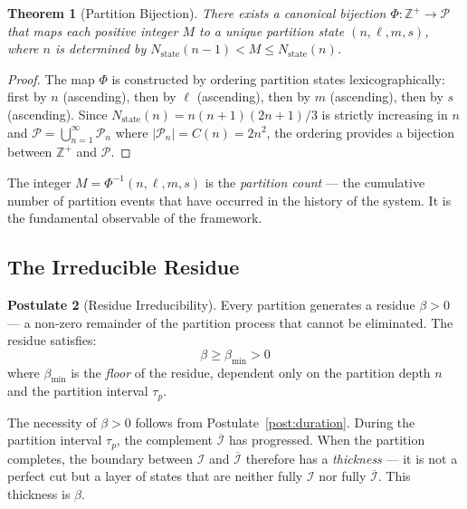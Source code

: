 \documentclass[11pt,twocolumn,a4paper]{article}
\theoremstyle{plain}
\newtheorem{theorem}{Theorem}[section]
\theoremstyle{definition}
\newtheorem{postulate}[theorem]{Postulate}
\theoremstyle{remark}
\begin{document}
\begin{theorem}[Partition Bijection]
\label{thm:bijection}
There exists a canonical bijection $\Phi: \mathbb{Z}^+ \to \mathcal{P}$ that
maps each positive integer $M$ to a unique partition state $(n,\ell,m,s)$, where
$n$ is determined by $N_{\mathrm{state}}(n-1) < M \leq N_{\mathrm{state}}(n)$.
\end{theorem}

\begin{proof}
The map $\Phi$ is constructed by ordering partition states lexicographically:
first by $n$ (ascending), then by $\ell$ (ascending), then by $m$ (ascending),
then by $s$ (ascending). Since $N_{\mathrm{state}}(n) = n(n+1)(2n+1)/3$ is
strictly increasing in $n$ and $\mathcal{P} = \bigcup_{n=1}^\infty
\mathcal{P}_n$ where $|\mathcal{P}_n| = C(n) = 2n^2$, the ordering provides a
bijection between $\mathbb{Z}^+$ and $\mathcal{P}$.
\end{proof}

The integer $M = \Phi^{-1}(n,\ell,m,s)$ is the \emph{partition count} --- the
cumulative number of partition events that have occurred in the history of the
system. It is the fundamental observable of the framework.

\subsection{The Irreducible Residue}
\label{subsec:residue}

\begin{postulate}[Residue Irreducibility]
\label{post:floor}
Every partition generates a residue $\beta > 0$ --- a non-zero remainder of the
partition process that cannot be eliminated. The residue satisfies:
\begin{equation}
    \beta \geq \beta_{\min} > 0
    \label{eq:floor}
\end{equation}
where $\beta_{\min}$ is the \emph{floor} of the residue, dependent only on the
partition depth $n$ and the partition interval $\tau_p$.
\end{postulate}

The necessity of $\beta > 0$ follows from Postulate~\ref{post:duration}. During
the partition interval $\tau_p$, the complement $\overline{\mathcal{I}}$ has
progressed. When the partition completes, the boundary between $\mathcal{I}$ and
$\overline{\mathcal{I}}$ therefore has a \emph{thickness} --- it is not a
perfect cut but a layer of states that are neither fully $\mathcal{I}$ nor fully
$\overline{\mathcal{I}}$. This thickness is $\beta$.
\end{document}
